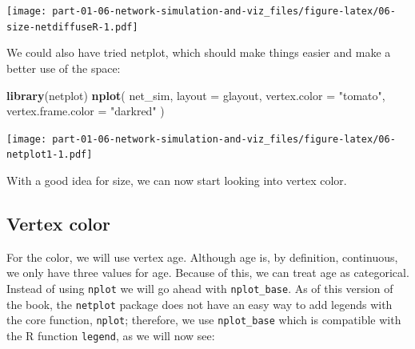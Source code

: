 \documentclass[
]{book}
\newenvironment{Shaded}{\begin{snugshade}}{\end{snugshade}}
\newcommand{\AttributeTok}[1]{\textcolor[rgb]{0.13,0.29,0.53}{#1}}
\newcommand{\FunctionTok}[1]{\textcolor[rgb]{0.13,0.29,0.53}{\textbf{#1}}}
\newcommand{\NormalTok}[1]{#1}
\newcommand{\StringTok}[1]{\textcolor[rgb]{0.31,0.60,0.02}{#1}}
\begin{document}
\texttt{[image: part-01-06-network-simulation-and-viz\_files/figure-latex/06-size-netdiffuseR-1.pdf]}

We could also have tried netplot, which should make things easier and make a better use of the space:

\begin{Shaded}
\begin{Highlighting}[]
\FunctionTok{library}\NormalTok{(netplot)}
\FunctionTok{nplot}\NormalTok{(}
\NormalTok{  net\_sim, }\AttributeTok{layout =}\NormalTok{ glayout,}
  \AttributeTok{vertex.color =} \StringTok{"tomato"}\NormalTok{,}
  \AttributeTok{vertex.frame.color =} \StringTok{"darkred"}
\NormalTok{  )}
\end{Highlighting}
\end{Shaded}

\texttt{[image: part-01-06-network-simulation-and-viz\_files/figure-latex/06-netplot1-1.pdf]}

With a good idea for size, we can now start looking into vertex color.

\hypertarget{vertex-color}{%
\subsection{Vertex color}\label{vertex-color}}

For the color, we will use vertex age. Although age is, by definition, continuous,
we only have three values for age. Because of this, we can treat age as categorical.
Instead of using \texttt{nplot} we will go ahead with \texttt{nplot\_base}. As of this version of
the book, the \texttt{netplot} package does not have an easy way to add legends with the
core function, \texttt{nplot}; therefore, we use \texttt{nplot\_base} which is compatible with
the R function \texttt{legend}, as we will now see:
\end{document}
